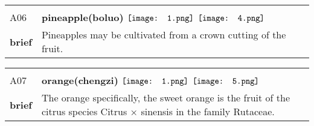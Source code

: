 \documentclass[UTF8]{article}
\begin{document}
            \begin{tabularx}{\textwidth}{p{1.5cm}X}
            \arrayrulecolor{myBlue}
        	\hline\\
            \small{A06}&
            \large{\bfseries{pineapple(boluo)}}\hfill
                                                            $\vcenter{\hbox{\texttt{[image: 1.png]}}}$
                                                                \phantom{$\vcenter{\hbox{\texttt{[image: 2.png]}}}$}
                                                                \phantom{$\vcenter{\hbox{\texttt{[image: 3.png]}}}$}
                                                                $\vcenter{\hbox{\texttt{[image: 4.png]}}}$
                                                                \phantom{$\vcenter{\hbox{\texttt{[image: 5.png]}}}$}
                                                                \phantom{$\vcenter{\hbox{\texttt{[image: 6.png]}}}$}
                                                                \phantom{$\vcenter{\hbox{\texttt{[image: 7.png]}}}$}
                                        \\[10pt]
            \large{\bfseries{brief}}&\noindent\parbox[c]{\hsize}{Pineapples may be cultivated from a crown cutting of the fruit.} \\[5pt]
            \hline\\[-10pt]
        \end{tabularx}
            \begin{tabularx}{\textwidth}{p{1.5cm}X}
            \arrayrulecolor{myBlue}
        	\hline\\
            \small{A07}&
            \large{\bfseries{orange(chengzi)}}\hfill
                                                            $\vcenter{\hbox{\texttt{[image: 1.png]}}}$
                                                                \phantom{$\vcenter{\hbox{\texttt{[image: 2.png]}}}$}
                                                                \phantom{$\vcenter{\hbox{\texttt{[image: 3.png]}}}$}
                                                                \phantom{$\vcenter{\hbox{\texttt{[image: 4.png]}}}$}
                                                                $\vcenter{\hbox{\texttt{[image: 5.png]}}}$
                                                                \phantom{$\vcenter{\hbox{\texttt{[image: 6.png]}}}$}
                                                                \phantom{$\vcenter{\hbox{\texttt{[image: 7.png]}}}$}
                                        \\[10pt]
            \large{\bfseries{brief}}&\noindent\parbox[c]{\hsize}{The orange specifically, the sweet orange is the fruit of the citrus species Citrus × sinensis in the family Rutaceae.} \\[5pt]
            \hline\\[-10pt]
        \end{tabularx}
\end{document}
